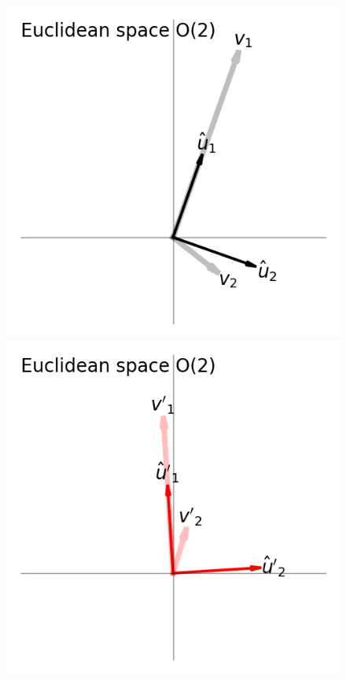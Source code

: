 \documentclass{article}
\newlength{\figurewidth}
\begin{document}
\begin{figure}[t]
\begin{mdframed}
\includegraphics[width=\figurewidth]{E_v.png}%
\includegraphics[width=\figurewidth]{E_vp.png}%

\end{mdframed}
\end{figure}
\end{document}
